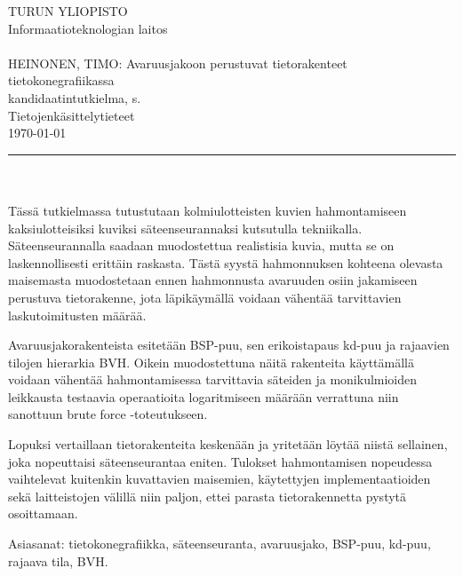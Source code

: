 ﻿\setlength{\hoffset}{-1in} \setlength{\oddsidemargin}{4cm} \addtolength{\textwidth}{1.3cm} \addtolength{\textheight}{1cm} \setlength{\voffset}{-1in}
\thispagestyle{empty}  %

\noindent
TURUN YLIOPISTO\\
Informaatioteknologian laitos\\
\\
HEINONEN, TIMO: Avaruusjakoon perustuvat tietorakenteet tietokonegrafiikassa\\
kandidaatintutkielma, \pageref{LastPage} s.\\
Tietojenkäsittelytieteet\\
\today\\
\rule{\textwidth}{.2mm}\\
\\
Tässä tutkielmassa tutustutaan kolmiulotteisten kuvien hahmontamiseen kaksiulotteisiksi kuviksi säteenseurannaksi kutsutulla tekniikalla. Säteenseurannalla saadaan muodostettua realistisia kuvia, mutta se on laskennollisesti erittäin raskasta. Tästä syystä hahmonnuksen kohteena olevasta maisemasta muodostetaan ennen hahmonnusta avaruuden osiin jakamiseen perustuva tietorakenne, jota läpikäymällä voidaan vähentää tarvittavien laskutoimitusten määrää.

\vspace{4mm}

Avaruusjakorakenteista esitetään BSP-puu, sen erikoistapaus kd-puu ja rajaavien tilojen hierarkia BVH. Oikein muodostettuna näitä rakenteita käyttämällä voidaan vähentää hahmontamisessa tarvittavia säteiden ja monikulmioiden leikkausta testaavia operaatioita logaritmiseen määrään verrattuna niin sanottuun brute force -toteutukseen. 

\vspace{4mm}

Lopuksi vertaillaan tietorakenteita keskenään ja yritetään löytää niistä sellainen, joka nopeuttaisi säteenseurantaa eniten. Tulokset hahmontamisen nopeudessa vaihtelevat kuitenkin kuvattavien maisemien, käytettyjen implementaatioiden sekä laitteistojen välillä niin paljon, ettei parasta tietorakennetta pystytä osoittamaan.


\vfill
\vspace{4mm}Asiasanat: tietokonegrafiikka, säteenseuranta, avaruusjako, BSP-puu, kd-puu, rajaava tila, BVH.

